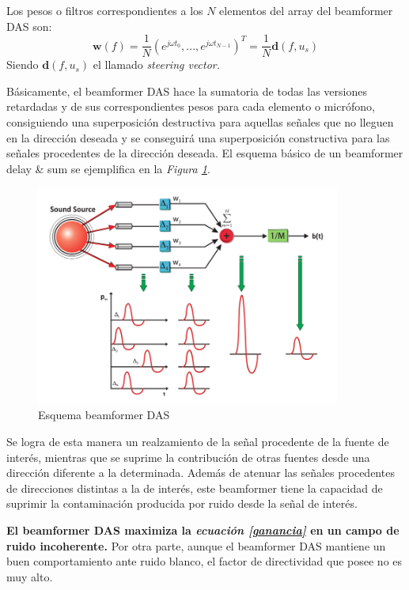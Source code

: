 \documentclass[a4paper,11pt]{book}
\begin{document}
		Los pesos o filtros correspondientes a los $N$ elementos del array del beamformer DAS son:
		\begin{equation}
		\textbf{w}(f) = \frac{1}{N} (e^{j \omega t_{0}},...,e^{j \omega t_{N-1}})^{T} = \frac{1}{N} \textbf{d}(f,u_{s})
		\end{equation}
		\label{steering}
		Siendo $\textbf{d}(f,u_{s})$ el llamado \textit{steering vector.}

		Básicamente, el beamformer DAS hace la sumatoria de todas las versiones retardadas y de sus correspondientes pesos para cada elemento o micrófono, consiguiendo una superposición destructiva para aquellas señales que no lleguen en la dirección deseada y se conseguirá una superposición constructiva para las señales procedentes de la dirección deseada. El esquema básico de un beamformer delay \& sum se ejemplifica en la \textit{Figura \ref{DAS}}.
		
		\begin{figure}[hbtp]
		\centering
		\includegraphics[width = 10cm]{FIGURAS/Delay-and-Sum-or-Classical-Beamforming.png}
		\caption{Esquema beamformer DAS}
		\label{DAS}
		\end{figure}
		
		
		 Se logra de esta manera un realzamiento de la señal procedente de la fuente de interés, mientras que se suprime la contribución de otras fuentes desde una dirección diferente a la determinada. Además de atenuar las señales procedentes de direcciones distintas a la de interés, este beamformer tiene la capacidad de suprimir la contaminación producida por ruido desde la señal de interés.
		
\textbf{		El beamformer DAS maximiza la \textit{ecuación \ref{ganancia}} en un campo de ruido incoherente.} Por otra parte, aunque el beamformer DAS mantiene un buen comportamiento ante ruido blanco, el factor de directividad que posee no es muy alto.
		
\end{document}
